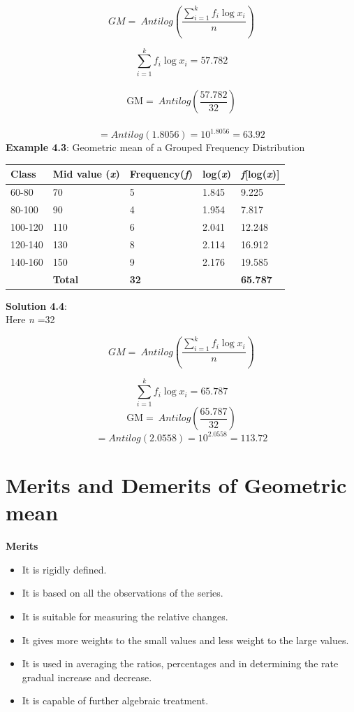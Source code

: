 \documentclass[
]{book}
\begin{document}
\[GM = \ Antilog\left( \frac{\sum_{i = 1}^{k}{{f_{i}\log}x_{i}}}{n} \right)\]

\[{\sum_{i = 1}^{k}{{f_{i}\log}x_{i}} = 57.782
}\]\\
\[{\text{GM} = \ Antilog\left( \frac{57.782}{32} \right)  }\]\\
\[{= Antilog\left( 1.8056 \right)= 10^{1.8056} = 63.92}\]
\textbf{Example 4.3}: Geometric mean of a Grouped Frequency Distribution

\begin{longtable}[]{@{}lllll@{}}
\toprule
Class & Mid value (\emph{x}) & Frequency(\emph{f}) & log(\emph{x}) & \emph{f}{[}log(\emph{x}){]} \\
\midrule
\endhead
60-80 & 70 & 5 & 1.845 & 9.225 \\
80-100 & 90 & 4 & 1.954 & 7.817 \\
100-120 & 110 & 6 & 2.041 & 12.248 \\
120-140 & 130 & 8 & 2.114 & 16.912 \\
140-160 & 150 & 9 & 2.176 & 19.585 \\
& \textbf{Total} & \textbf{32} & & \textbf{65.787} \\
\bottomrule
\end{longtable}

\textbf{Solution 4.4}:\\
Here \emph{n} =32

\[GM = \ Antilog\left( \frac{\sum_{i = 1}^{k}{{f_{i}\log}x_{i}}}{n} \right)\]

\[{\sum_{i = 1}^{k}{{f_{i}\log}x_{i}} = 65.787}\]
\[{\text{GM} = \ Antilog\left( \frac{65.787}{32} \right)}\]
\[{= Antilog\left( 2.0558 \right) = 10^{2.0558} = 113.72}\]

\hypertarget{merits-and-demerits-of-geometric-mean}{%
\section{Merits and Demerits of Geometric mean}\label{merits-and-demerits-of-geometric-mean}}

{\textbf{Merits}}

\begin{itemize}
\item
  It is rigidly defined.
\item
  It is based on all the observations of the series.
\item
  It is suitable for measuring the relative changes.
\item
  It gives more weights to the small values and less weight to the
  large values.
\item
  It is used in averaging the ratios, percentages and in determining
  the rate gradual increase and decrease.
\item
  It is capable of further algebraic treatment.
\end{itemize}
\end{document}
